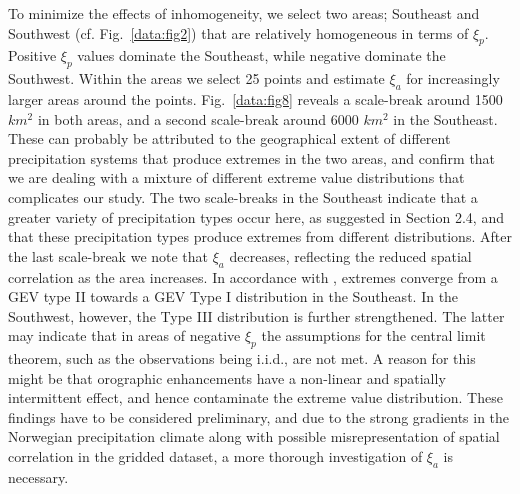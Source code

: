\documentclass[12pt,a4paper,english]{article}
\begin{document}
To minimize the effects of inhomogeneity, we select two areas; Southeast and Southwest (cf. Fig.~\ref{data:fig2}) that are relatively homogeneous in terms of $\xi_{p}$. Positive $\xi_{p}$ values dominate the Southeast, while negative dominate the Southwest. Within the areas we select 25 points and estimate $\xi_{a}$ for increasingly larger areas around the points. Fig.~\ref{data:fig8} reveals a scale-break around 1500 $km^2$ in both areas, and a second scale-break around 6000 $km^2$ in the Southeast. These can probably be attributed to the geographical extent of different precipitation systems that produce extremes in the two areas, and confirm that we are dealing with a mixture of different extreme value distributions that complicates our study. The two scale-breaks in the Southeast indicate that a greater variety of precipitation types occur here, as suggested in Section 2.4, and that these precipitation types produce extremes from different distributions. After the last scale-break we note that $\xi_{a}$ decreases, reflecting the reduced spatial correlation as the area increases. In accordance with \cite{Overeemetal2010}, extremes converge from a GEV type II towards a GEV Type I distribution in the Southeast. In the Southwest, however, the Type III distribution is further strengthened. %
The latter may indicate that in areas of negative $\xi_{p}$ the assumptions for the central limit theorem, such as the observations being i.i.d., are not met. A reason for this might be that orographic enhancements have a non-linear and spatially intermittent effect, and hence contaminate the extreme value distribution. 
These findings have to be considered preliminary, and due to the strong gradients in the Norwegian precipitation climate along with possible misrepresentation of spatial correlation in the gridded dataset, a more thorough investigation of $\xi_{a}$ is necessary.   

\vspace{5mm}
\end{document}
